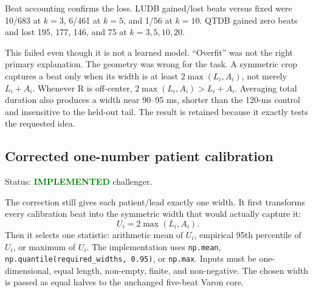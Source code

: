 \documentclass[11pt,a4paper]{article}
\newcommand{\implemented}{\textcolor{green}{\textbf{IMPLEMENTED}}}
\begin{document}
Beat accounting confirms the loss. LUDB gained/lost beats versus fixed were 10/683 at $k=3$, 6/461 at $k=5$, and 1/56 at $k=10$. QTDB gained zero beats and lost 195, 177, 146, and 75 at $k=3,5,10,20$.

This failed even though it is not a learned model. ``Overfit'' was not the right primary explanation. The geometry was wrong for the task. A symmetric crop captures a beat only when its width is at least $2\max(L_i,A_i)$, not merely $L_i+A_i$. Whenever R is off-center, $2\max(L_i,A_i)>L_i+A_i$. Averaging total duration also produces a width near 90--95 ms, shorter than the 120-ms control and insensitive to the held-out tail. The result is retained because it exactly tests the requested idea.

\subsection{Corrected one-number patient calibration}

Status: \implemented{} challenger.

The correction still gives each patient/lead exactly one width. It first transforms every calibration beat into the symmetric width that would actually capture it:
\[
U_i=2\max(L_i,A_i).
\]
Then it selects one statistic: arithmetic mean of $U_i$, empirical 95th percentile of $U_i$, or maximum of $U_i$. The implementation uses \texttt{np.mean}, \texttt{np.quantile(required\_widths, 0.95)}, or \texttt{np.max}. Inputs must be one-dimensional, equal length, non-empty, finite, and non-negative. The chosen width is passed as equal halves to the unchanged five-beat Varon core.
\end{document}
